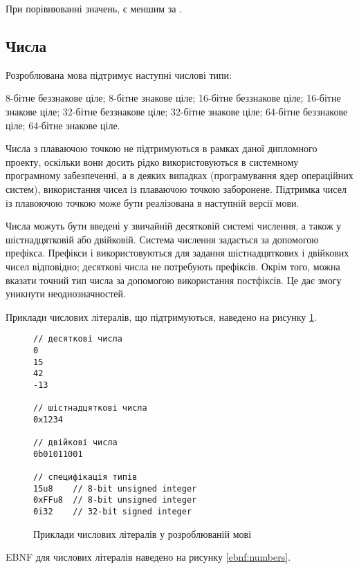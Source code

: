 \documentclass[main.tex]{subfiles}
\begin{document}
При порівнюванні значень,  є меншим за .

\FloatBarrier
\subsection{Числа}
Розроблювана мова підтримує наступні числові типи:
\begin{itemize}[nosep]
 8-бітне беззнакове ціле;
 8-бітне знакове ціле;
 16-бітне беззнакове ціле;
 16-бітне знакове ціле;
 32-бітне беззнакове ціле;
 32-бітне знакове ціле;
 64-бітне беззнакове ціле;
 64-бітне знакове ціле.
\end{itemize}

Числа з плаваючою точкою не підтримуються в рамках даної дипломного проекту, оскільки вони досить рідко використовуються в системному програмному забезпеченні, а в деяких випадках (програмування ядер операційних систем), використання чисел із плаваючою точкою заборонене.
Підтримка чисел із плавоючою точкою може бути реалізована в наступній версії мови.

Числа можуть бути введені у звичайній десятковій системі числення, а також у шістнадцятковій або двійковій.
Система числення задається за допомогою префікса.
Префікси  і  використовуються для задання шістнадцяткових і двійкових чисел відповідно; десяткові числа не потребують префіксів.
Окрім того, можна вказати точний тип числа за допомогою використання постфіксів.
Це дає змогу уникнути неоднозначностей.

Приклади числових літералів, що підтримуються, наведено на рисунку \ref{lang:literals:numbers}.

\begin{figure}[h]
  \centering
  \begin{verbatim}
// десяткові числа
0
15
42
-13

// шістнадцяткові числа
0x1234

// двійкові числа
0b01011001

// специфікація типів
15u8    // 8-bit unsigned integer
0xFFu8  // 8-bit unsigned integer
0i32    // 32-bit signed integer
  \end{verbatim}
  \caption{Приклади числових літералів у розроблюваній мові}
  \label{lang:literals:numbers}
\end{figure}

EBNF для числових літералів наведено на рисунку \ref{ebnf:numbers}.
\end{document}
